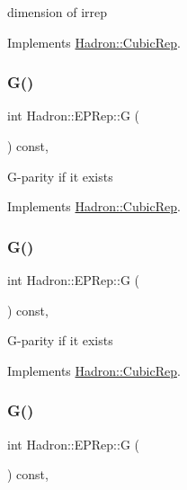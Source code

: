 dimension of irrep 

Implements \mbox{\hyperlink{structHadron_1_1CubicRep_ac178d14064f037a66af4b9fb4b312d51}{Hadron\+::\+Cubic\+Rep}}.

\mbox{\label{structHadron_1_1EPRep_acedbb348e3c15b9e210b5e187b2c08cd}} 
\subsubsection{\texorpdfstring{G()}{G()}\hspace{0.1cm}{\footnotesize\ttfamily [1/3]}}
{\footnotesize\ttfamily int Hadron\+::\+E\+P\+Rep\+::G (\begin{DoxyParamCaption}{ }\end{DoxyParamCaption}) const\hspace{0.3cm}{\ttfamily [inline]}, {\ttfamily [virtual]}}

G-\/parity if it exists 

Implements \mbox{\hyperlink{structHadron_1_1CubicRep_a52104e43266d1614c00bbd1c3b395458}{Hadron\+::\+Cubic\+Rep}}.

\mbox{\label{structHadron_1_1EPRep_acedbb348e3c15b9e210b5e187b2c08cd}} 
\subsubsection{\texorpdfstring{G()}{G()}\hspace{0.1cm}{\footnotesize\ttfamily [2/3]}}
{\footnotesize\ttfamily int Hadron\+::\+E\+P\+Rep\+::G (\begin{DoxyParamCaption}{ }\end{DoxyParamCaption}) const\hspace{0.3cm}{\ttfamily [inline]}, {\ttfamily [virtual]}}

G-\/parity if it exists 

Implements \mbox{\hyperlink{structHadron_1_1CubicRep_a52104e43266d1614c00bbd1c3b395458}{Hadron\+::\+Cubic\+Rep}}.

\mbox{\label{structHadron_1_1EPRep_acedbb348e3c15b9e210b5e187b2c08cd}} 
\subsubsection{\texorpdfstring{G()}{G()}\hspace{0.1cm}{\footnotesize\ttfamily [3/3]}}
{\footnotesize\ttfamily int Hadron\+::\+E\+P\+Rep\+::G (\begin{DoxyParamCaption}{ }\end{DoxyParamCaption}) const\hspace{0.3cm}{\ttfamily [inline]}, {\ttfamily [virtual]}}

